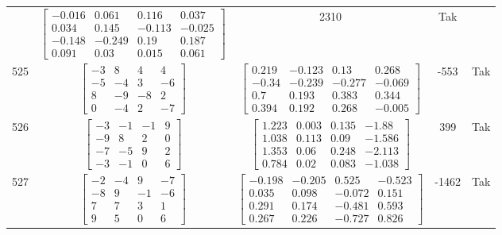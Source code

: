 \documentclass[a4paper,12pt]{article}
\begin{document}
\begin{tabular}{c c c c c}
&
$\begin{bmatrix} -0.016 & 0.061 & 0.116 & 0.037 \\ 0.034 & 0.145 & -0.113 & -0.025 \\ -0.148 & -0.249 & 0.19 & 0.187 \\ 0.091 & 0.03 & 0.015 & 0.061 \end{bmatrix}$
&
2310
&
Tak
\\
525
&
$\begin{bmatrix} -3 & 8 & 4 & 4 \\ -5 & -4 & 3 & -6 \\ 8 & -9 & -8 & 2 \\ 0 & -4 & 2 & -7 \end{bmatrix}$
&
$\begin{bmatrix} 0.219 & -0.123 & 0.13 & 0.268 \\ -0.34 & -0.239 & -0.277 & -0.069 \\ 0.7 & 0.193 & 0.383 & 0.344 \\ 0.394 & 0.192 & 0.268 & -0.005 \end{bmatrix}$
&
-553
&
Tak
\\
526
&
$\begin{bmatrix} -3 & -1 & -1 & 9 \\ -9 & 8 & 2 & 0 \\ -7 & -5 & 9 & 2 \\ -3 & -1 & 0 & 6 \end{bmatrix}$
&
$\begin{bmatrix} 1.223 & 0.003 & 0.135 & -1.88 \\ 1.038 & 0.113 & 0.09 & -1.586 \\ 1.353 & 0.06 & 0.248 & -2.113 \\ 0.784 & 0.02 & 0.083 & -1.038 \end{bmatrix}$
&
399
&
Tak
\\
527
&
$\begin{bmatrix} -2 & -4 & 9 & -7 \\ -8 & 9 & -1 & -6 \\ 7 & 7 & 3 & 1 \\ 9 & 5 & 0 & 6 \end{bmatrix}$
&
$\begin{bmatrix} -0.198 & -0.205 & 0.525 & -0.523 \\ 0.035 & 0.098 & -0.072 & 0.151 \\ 0.291 & 0.174 & -0.481 & 0.593 \\ 0.267 & 0.226 & -0.727 & 0.826 \end{bmatrix}$
&
-1462
&
Tak
\\

\end{tabular}
\end{document}
